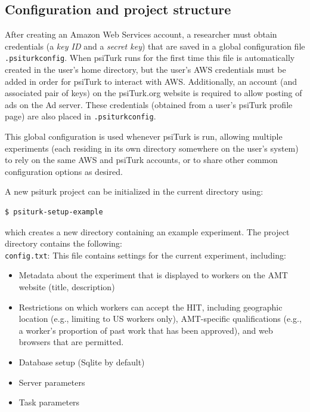 \documentclass[twocolumn]{svjour3}          %
\begin{document}
\subsection{Configuration and project structure}

After creating an Amazon Web Services account, a researcher must obtain credentials (a \emph{key ID} and a \emph{secret key}) that are saved in a global configuration file \texttt{.psiturkconfig}.
When psiTurk runs for the first time this file is automatically created in the user's home directory, but the user's AWS credentials must be added in order for psiTurk to interact with AWS.
Additionally, an account (and associated pair of keys) on the psiTurk.org website is required to allow posting of ads on the Ad server.
These credentials (obtained from a user's psiTurk profile page) are also placed in \texttt{.psiturkconfig}.

This global configuration is used whenever psiTurk is run, allowing multiple experiments (each residing in its own directory somewhere on the user's system) to rely on the same AWS and psiTurk accounts, or to share other common configuration options as desired.

A new psiturk project can be initialized in the current directory using:

\begin{lstlisting}
$ psiturk-setup-example
\end{lstlisting}

\noindent which creates a new directory containing an example experiment.
The project directory contains the following: \\


\noindent \texttt{config.txt}: This file contains settings for the current experiment, including:

\begin{itemize}
\item Metadata about the experiment that is displayed to workers on the AMT website (title, description)
\item Restrictions on which workers can accept the HIT, including geographic location (e.g., limiting to US workers only), AMT-specific qualifications (e.g., a worker's proportion of past work that has been approved), and web browsers that are permitted.
\item Database setup (Sqlite by default)
\item Server parameters
\item Task parameters
\end{itemize}
\end{document}
